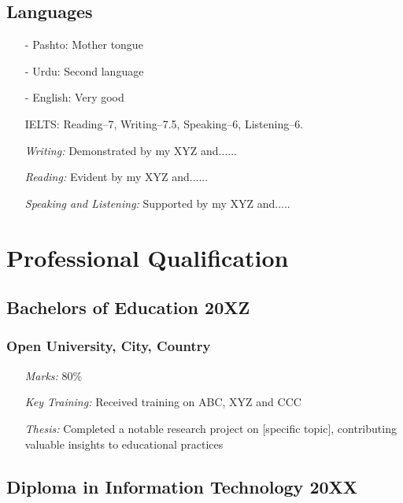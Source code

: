 \documentclass[11pt]{article}
\begin{document}
    \subsection{Languages}
    \begin{itemize}
        \item[-] \textcolor{Sepia}{Pashto}: Mother tongue
        \item[-] \textcolor{Sepia}{Urdu}: Second language
        \item[-] \textcolor{Sepia}{English}: Very good
            \item[\checkmark] IELTS: Reading--7, Writing--7.5, Speaking--6, Listening--6.
            \item[\checkmark] \textit{Writing:}  Demonstrated by my XYZ and......
            \item[\checkmark] \textit{Reading:}  Evident by my XYZ and......
            \item[\checkmark] \textit{Speaking and Listening:} Supported by my XYZ and.....
        \end{itemize}
    

    \section{Professional Qualification}

    \subsection{Bachelors of Education \hfill \normalfont 20XZ}
    \subsubsection{Open University,  City, Country }
    \begin{itemize}
        \item[\checkmark] \textit{Marks:} 80\% %
        \item[\checkmark] \textit{Key Training:} Received training on ABC, XYZ and CCC
        \item[\checkmark] \textit{Thesis:} Completed a notable research project on [specific topic], contributing valuable insights to educational practices
    \end{itemize}
    
    \subsection{Diploma in Information Technology \hfill \normalfont 20XX}
\end{document}
